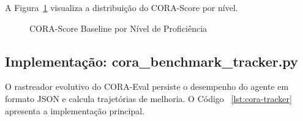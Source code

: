A Figura~\ref{fig:cora-baseline} visualiza a distribuição do
CORA-Score por nível.

\begin{figure}[htb]
\centering
\caption{CORA-Score Baseline por Nível de Proficiência}
\label{fig:cora-baseline}
\end{figure}

\subsection{Implementação: cora\_benchmark\_tracker.py}

O rastreador evolutivo do CORA-Eval persiste o desempenho do agente
em formato JSON e calcula trajetórias de melhoria. O Código~ \ref{lst:cora-tracker}
apresenta a implementação principal.

